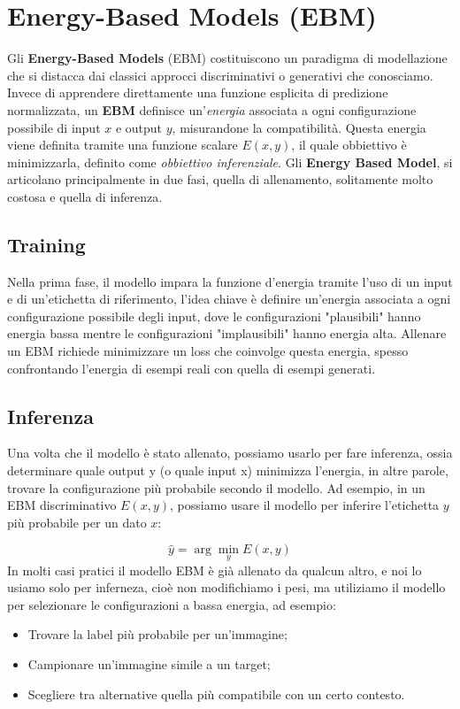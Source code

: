 \chapter{Energy-Based Models (EBM)}

Gli \textbf{Energy-Based Models} (EBM) costituiscono un paradigma di modellazione che si distacca dai classici approcci discriminativi o generativi che conosciamo. Invece di apprendere direttamente una funzione esplicita di predizione normalizzata, un \textbf{EBM} definisce un'\textit{energia} associata a ogni configurazione possibile di input $x$ e output $y$, misurandone la compatibilità. Questa energia viene definita tramite una funzione scalare $E(x, y)$, il quale obbiettivo è minimizzarla, definito come \textit{obbiettivo inferenziale}. Gli \textbf{Energy Based Model}, si articolano principalmente in due fasi, quella di allenamento, solitamente molto costosa e quella di inferenza. 

\section{Training}
Nella prima fase, il modello impara la funzione d'energia tramite l'uso di un input e di un'etichetta di riferimento, l’idea chiave è definire un’energia associata a ogni configurazione possibile degli input, dove le configurazioni "plausibili" hanno energia bassa mentre le configurazioni "implausibili" hanno energia alta. Allenare un EBM richiede minimizzare un loss che coinvolge questa energia, spesso confrontando l’energia di esempi reali con quella di esempi generati.
\section{Inferenza}
Una volta che il modello è stato allenato, possiamo usarlo per fare inferenza, ossia determinare quale output y (o quale input x) minimizza l’energia, in altre parole, trovare la configurazione più probabile secondo il modello. Ad esempio, in un EBM discriminativo $E(x,y)$, possiamo usare il modello per inferire l’etichetta $y$ più probabile per un dato $x$:

\begin{equation}
    \hat{y} = \arg\min_y E(x, y)
\end{equation}
In molti casi pratici il modello EBM è già allenato da qualcun altro, e noi lo usiamo solo per inferneza, cioè non modifichiamo i pesi, ma utiliziamo il modello per selezionare le configurazioni a bassa energia, ad esempio:
\begin{itemize}
    \item Trovare la label più probabile per un'immagine;
    \item Campionare un'immagine simile a un target;
    \item Scegliere tra alternative quella più compatibile con un certo contesto.
\end{itemize}

